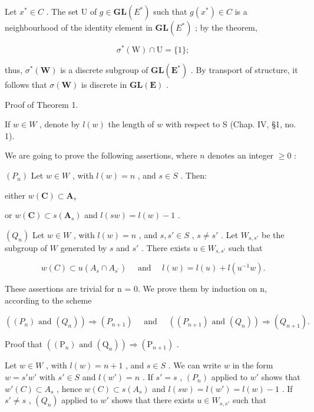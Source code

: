 Let \(x^{*} \in C\) . The set U of \(g \in \mathbf{GL}(E^{*})\) such that \(g(x^{*}) \in C\) is a neighbourhood of the identity element in \(\mathbf{GL}(E^{*})\) ; by the theorem,

\[
\sigma^ {*} (\mathrm{W}) \cap \mathrm{U} = \{1 \};
\]

thus, \(\sigma^{*}(\mathbf{W})\) is a discrete subgroup of \(\mathbf{GL}(\mathbf{E}^{*})\) . By transport of structure, it follows that \(\sigma(\mathbf{W})\) is discrete in \(\mathbf{GL}(\mathbf{E})\) .

Proof of Theorem 1.

If \(w \in W\) , denote by \(l(w)\) the length of \(w\) with respect to S (Chap. IV, §1, no. 1).

We are going to prove the following assertions, where \(n\) denotes an integer \(\geqslant 0\) :

\((P_n)\) Let \(w \in W\) , with \(l(w) = n\) , and \(s \in S\) . Then:

either \(w(\mathbf{C})\subset \mathbf{A}_s\)

or \(w(\mathbf{C}) \subset s(\mathbf{A}_s)\) and \(l(sw) = l(w) - 1\) .

\((Q_n)\) Let \(w \in W\) , with \(l(w) = n\) , and \(s, s' \in S\) , \(s \neq s'\) . Let \(W_{s,s'}\) be the subgroup of \(W\) generated by \(s\) and \(s'\) . There exists \(u \in W_{s,s'}\) such that

\[
w (C) \subset u \left(A _ {s} \cap A _ {s ^ {\prime}}\right) \quad \text { and } \quad l (w) = l (u) + l \left(u ^ {- 1} w\right).
\]

These assertions are trivial for n = 0. We prove them by induction on n, according to the scheme

\[
\left(\left(P _ {n}\right) \text {   and   } \left(Q _ {n}\right)\right) \Longrightarrow \left(P _ {n + 1}\right) \quad \text { and } \quad \left(\left(P _ {n + 1}\right) \text {   and   } \left(Q _ {n}\right)\right) \Longrightarrow \left(Q _ {n + 1}\right).
\]

Proof that \(\left((\mathrm{P}_n)\text{ and } (\mathrm{Q}_n)\right) \Longrightarrow (\mathrm{P}_{n+1})\) .

Let \(w \in W\) , with \(l(w) = n + 1\) , and \(s \in S\) . We can write \(w\) in the form \(w = s'w'\) with \(s' \in S\) and \(l(w') = n\) . If \(s' = s\) , \((P_n)\) applied to \(w'\) shows that \(w'(C) \subset A_s\) , hence \(w(C) \subset s(A_s)\) and \(l(sw) = l(w') = l(w) - 1\) . If \(s' \neq s\) , \((Q_n)\) applied to \(w'\) shows that there exists \(u \in W_{s,s'}\) such that

